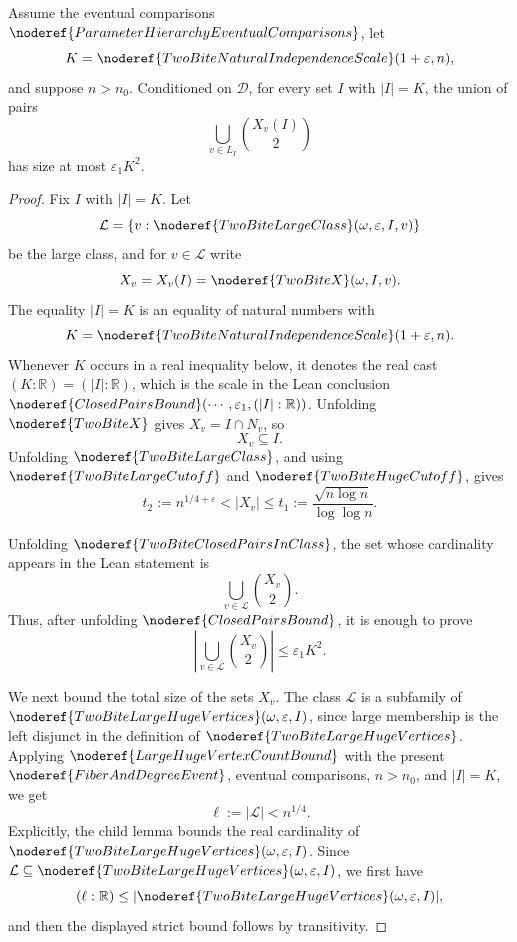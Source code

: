 \begin{lemma}
Assume the eventual comparisons
\(\noderef{ParameterHierarchyEventualComparisons}\), let
\[
K=\noderef{TwoBiteNaturalIndependenceScale}(1+\varepsilon,n),
\]
and suppose \(n>n_0\).  Conditioned on \(\mathcal D\), for every set \(I\)
with \(|I|=K\), the union of pairs
\[
\bigcup_{v\in L_I}\binom{X_v(I)}2
\]
has size at most \(\varepsilon_1 K^2\).
\end{lemma}
\begin{proof}
Fix \(I\) with \(|I|=K\).  Let
\[
\mathcal L=\{v:\noderef{TwoBiteLargeClass}(\omega,\varepsilon,I,v)\}
\]
be the large class, and for \(v\in\mathcal L\) write
\[
X_v=X_v(I)=\noderef{TwoBiteX}(\omega,I,v).
\]
The equality \(|I|=K\) is an equality of natural numbers with
\[
K=\noderef{TwoBiteNaturalIndependenceScale}(1+\varepsilon,n).
\]
Whenever \(K\) occurs in a real inequality below, it denotes the real cast
\((K:\mathbb R)=(|I|:\mathbb R)\), which is the scale in the Lean conclusion
\(\noderef{ClosedPairsBound}(\cdots,\varepsilon_1,(|I|:\mathbb R))\).
Unfolding \(\noderef{TwoBiteX}\) gives \(X_v=I\cap N_v\), so
\[
X_v\subseteq I. \tag{1}
\]
Unfolding \(\noderef{TwoBiteLargeClass}\), and using
\(\noderef{TwoBiteLargeCutoff}\) and \(\noderef{TwoBiteHugeCutoff}\), gives
\[
t_2:=n^{1/4+\varepsilon}<|X_v|
\le
t_1:=\frac{\sqrt{n\log n}}{\log\log n}. \tag{2}
\]

Unfolding \(\noderef{TwoBiteClosedPairsInClass}\), the set whose cardinality
appears in the Lean statement is
\[
\bigcup_{v\in\mathcal L}\binom{X_v}{2}.
\]
Thus, after unfolding \(\noderef{ClosedPairsBound}\), it is enough to prove
\[
\left|\bigcup_{v\in\mathcal L}\binom{X_v}{2}\right|
\le \varepsilon_1K^2. \tag{3}
\]

We next bound the total size of the sets \(X_v\).  The class \(\mathcal L\) is
a subfamily of
\(\noderef{TwoBiteLargeHugeVertices}(\omega,\varepsilon,I)\), since
large membership is the left disjunct in the definition of
\(\noderef{TwoBiteLargeHugeVertices}\).  Applying
\(\noderef{LargeHugeVertexCountBound}\) with the present
\(\noderef{FiberAndDegreeEvent}\), eventual comparisons, \(n>n_0\), and
\(|I|=K\), we get
\[
\ell:=|\mathcal L|<n^{1/4}. \tag{4}
\]
Explicitly, the child lemma bounds the real cardinality of
\(\noderef{TwoBiteLargeHugeVertices}(\omega,\varepsilon,I)\).  Since
\(\mathcal L\subseteq\noderef{TwoBiteLargeHugeVertices}(\omega,\varepsilon,I)\),
we first have
\[
(\ell:\mathbb R)\le
|\noderef{TwoBiteLargeHugeVertices}(\omega,\varepsilon,I)|,
\]
and then the displayed strict bound follows by transitivity.


\end{proof}
